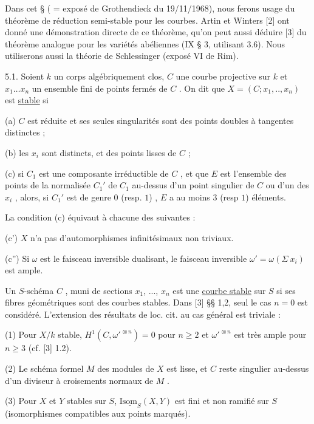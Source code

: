 Dans cet § ( = exposé de Grothendieck du 19/11/1968), nous ferons usage du théorème de réduction semi-stable pour les courbes. Artin et Winters [2] ont donné une démonstration directe de ce théorème, qu'on peut aussi déduire [3] du théorème analogue pour les variétés abéliennes (IX § 3, utilisant 3.6). Nous utiliserons aussi la théorie de  Schlessinger (exposé VI de  Rim).

5.1.  Soient  $k$  un corps algébriquement clos, $C$ une courbe projective sur  $k$  et $x_1 \ldots x_n$  un ensemble fini de points fermés de  $C$ . On dit que  $X = (C ; x_1,.., x_n)$ est \underline{stable} si

(a) $C$ est réduite et ses seules singularités sont des points doubles à tangentes distinctes ;

(b) les  $x_i$  sont distincts, et des points lisses de  $C$ ;

(c) si  $C_1$  est une composante irréductible de  $C$ , et que  $E$  est l'ensemble des points de la normalisée  $C_1'$  de  $C_1$  au-dessus d'un point singulier de  $C$  ou d'un des  $x_i$ , alors, si  $C_1'$  est de genre  $0$  (resp. $1$) ,  $E$  a au moins  $3$ (resp $1$) éléments.

La condition (c) équivaut à chacune des suivantes :

(c')  $X$  n'a pas d'automorphismes infinitésimaux non triviaux.

(c'')  Si  $\omega$  est le faisceau inversible dualisant, le faisceau inversible $\omega' = \omega(\Sigma\ x_i)$  est ample.

Un  $S$-schéma  $C$ , muni de sections  $x_1$, ...,  $x_n$  est une \underline{courbe stable}  sur $S$  si ses fibres géométriques sont des courbes stables. Dans [3] §§ 1,2, seul le cas $n = 0$  est considéré. L'extension des résultats de loc. cit. au cas général est triviale :

(1) Pour  $X/k$  stable,  $H^1(C,\omega'^{\,\otimes n}) = 0$  pour  $n \geqslant 2$  et  $\omega'^{\,\otimes n}$  est très ample pour  $n \geqslant 3$  (cf. [3] 1.2).

(2) Le schéma formel  $M$  des modules de  $X$  est lisse, et  $C$  reste singulier au-dessus d'un diviseur à croisements normaux de  $M$ .



(3) Pour  $X$  et  $Y$  stables sur  $S$, $\mathrm{I}\underline{\mathrm{som}}_{S}(X,Y)$  est fini et non ramifié sur $S$  (isomorphismes compatibles aux points marqués).

